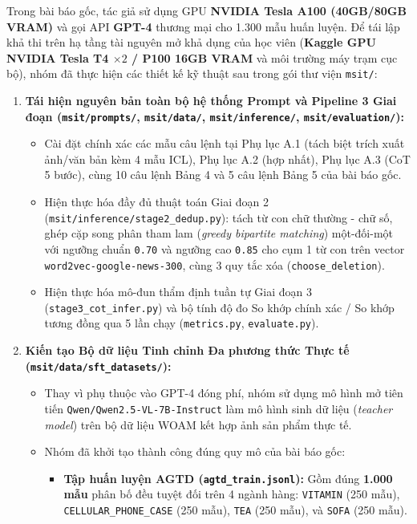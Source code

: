 \documentclass[conference,10pt]{IEEEtran}
\begin{document}
Trong bài báo gốc, tác giả sử dụng GPU \textbf{NVIDIA Tesla A100 (40GB/80GB VRAM)} và gọi API \textbf{GPT-4} thương mại cho 1.300 mẫu huấn luyện. Để tái lập khả thi trên hạ tầng tài nguyên mở khả dụng của học viên (\textbf{Kaggle GPU NVIDIA Tesla T4 $\times 2$ / P100 16GB VRAM} và môi trường máy trạm cục bộ), nhóm đã thực hiện các thiết kế kỹ thuật sau trong gói thư viện \texttt{msit/}:
\begin{enumerate}
    \item \textbf{Tái hiện nguyên bản toàn bộ hệ thống Prompt và Pipeline 3 Giai đoạn (\texttt{msit/prompts/}, \texttt{msit/data/}, \texttt{msit/inference/}, \texttt{msit/evaluation/}):}
    \begin{itemize}
        \item Cài đặt chính xác các mẫu câu lệnh tại Phụ lục A.1 (tách biệt trích xuất ảnh/văn bản kèm 4 mẫu ICL), Phụ lục A.2 (hợp nhất), Phụ lục A.3 (CoT 5 bước), cùng 10 câu lệnh Bảng 4 và 5 câu lệnh Bảng 5 của bài báo gốc.
        \item Hiện thực hóa đầy đủ thuật toán Giai đoạn 2 (\texttt{msit/inference/stage2\_dedup.py}): tách từ con chữ thường - chữ số, ghép cặp song phân tham lam (\textit{greedy bipartite matching}) một-đối-một với ngưỡng chuẩn \texttt{0.70} và ngưỡng cao \texttt{0.85} cho cụm 1 từ con trên vector \texttt{word2vec-google-news-300}, cùng 3 quy tắc xóa (\texttt{choose\_deletion}).
        \item Hiện thực hóa mô-đun thẩm định tuần tự Giai đoạn 3 (\texttt{stage3\_cot\_infer.py}) và bộ tính độ đo So khớp chính xác / So khớp tương đồng qua 5 lần chạy (\texttt{metrics.py}, \texttt{evaluate.py}).
    \end{itemize}
    \item \textbf{Kiến tạo Bộ dữ liệu Tinh chỉnh Đa phương thức Thực tế (\texttt{msit/data/sft\_datasets/}):}
    \begin{itemize}
        \item Thay vì phụ thuộc vào GPT-4 đóng phí, nhóm sử dụng mô hình mở tiên tiến \texttt{Qwen/Qwen2.5-VL-7B-Instruct} làm mô hình sinh dữ liệu (\textit{teacher model}) trên bộ dữ liệu WOAM kết hợp ảnh sản phẩm thực tế.
        \item Nhóm đã khởi tạo thành công đúng quy mô của bài báo gốc:
        \begin{itemize}
            \item \textbf{Tập huấn luyện AGTD (\texttt{agtd\_train.jsonl}):} Gồm đúng \textbf{1.000 mẫu} phân bố đều tuyệt đối trên 4 ngành hàng: \texttt{VITAMIN} (250 mẫu), \texttt{CELLULAR\_PHONE\_CASE} (250 mẫu), \texttt{TEA} (250 mẫu), và \texttt{SOFA} (250 mẫu).

\end{itemize}
\end{itemize}
\end{enumerate}
\end{document}
